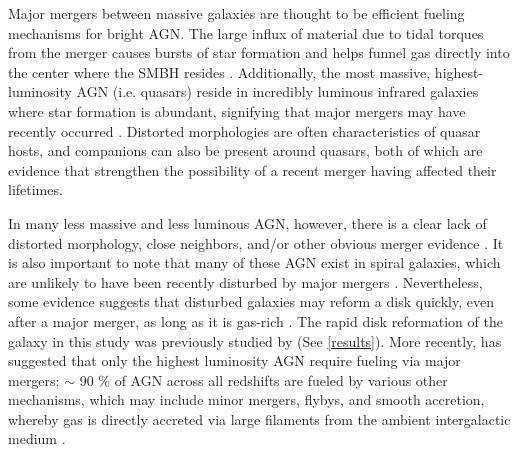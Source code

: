\documentclass[]{emulateapj}
\begin{document}


Major mergers between massive galaxies are thought to be efficient fueling mechanisms for bright AGN. The large influx of material due to tidal torques from the merger causes bursts of star formation and helps funnel gas directly into the center where the SMBH resides \citep[e.g.][]{Richards2006,Reddy2008,Hopkins2010}. Additionally, the most massive, highest-luminosity AGN (i.e. quasars) reside in incredibly luminous infrared galaxies where star formation is abundant, signifying that major mergers may have recently occurred \citep{Treister2012}. Distorted morphologies are often characteristics of quasar hosts, and companions can also be present around quasars, both of which are evidence that strengthen the possibility of a recent merger having affected their lifetimes. 

In many less massive and less luminous AGN, however, there is a clear lack of distorted morphology, close neighbors, and/or other obvious merger evidence \citep{Ryan2007,Schawinski2011,Ellison2013,Hicks2013}. It is also important to note that many of these AGN exist in spiral galaxies, which are unlikely to have been recently disturbed by major mergers \citep{Schawinski2011,Kocevski2011}. Nevertheless, some evidence suggests that disturbed galaxies may reform a disk quickly, even after a major merger, as long as it is gas-rich \citep{vanGorkom1997}. The rapid disk reformation of the galaxy in this study was previously studied by \cite{Governato2009} (See \ref{results}). More recently, \cite{Treister2012} has suggested that only the highest luminosity AGN require fueling via major mergers; $\sim$ 90 $\%$ of AGN across all redshifts are fueled by various other mechanisms, which may include minor mergers, flybys, and smooth accretion, whereby gas is directly accreted via large filaments from the ambient intergalactic medium \citep{Cox2006,Bellovary2013,Sinha2012}.
\end{document}
